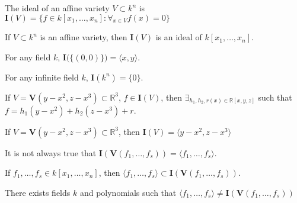 \documentclass[crop=false,class=book,oneside]{standalone}
\begin{document}
                \begin{definition}
                    The ideal of an affine variety
                    $V\subset k^n$ is
                    $\mathbf{I}(V)%
                     =\{f\in k[x_1,\hdots ,x_n]:\forall_{x\in V}f(x)=0\}$
                \end{definition}
                \begin{theorem}
                    If $V\subset k^n$ is an affine variety,
                    then $\mathbf{I}(V)$ is an ideal of
                    $k[x_1,\hdots ,x_n]$.
                \end{theorem}
                \begin{theorem}
                    For any field $k$,
                    $\mathbf{I}\big(\{(0,0)\}\big)=\langle x,y\rangle$.
                \end{theorem}
                \begin{theorem}
                    For any infinite field $k$,
                    $\mathbf{I}(k^n)=\{0\}$.
                \end{theorem}
                \begin{theorem}
                    If $V=\mathbf{V}(y-x^2,z-x^3)\subset\mathbb{R}^3$,
                    $f\in \mathbf{I}(V)$,
                    then $\exists_{h_1,h_2,r(x)\in\mathbb{R}[x,y,z]}$
                    such that $f=h_1(y-x^2)+h_2(z-x^3)+r$.
                \end{theorem}
                \begin{theorem}
                    If $V=\mathbf{V}(y-x^2,z-x^3)\subset\mathbb{R}^3$,
                    then $\mathbf{I}(V)=\langle y-x^2,z-x^3\rangle$
                \end{theorem}
                \begin{remark}
                    It is not always true that
                    $\mathbf{I}(\mathbf{V}(f_1,\hdots, f_s))%
                     =\langle f_1,\hdots, f_s\rangle$.
                \end{remark}
                \begin{theorem}
                    If $f_1,\hdots, f_s \in k[x_1,\hdots ,x_n]$, then
                    $\langle f_1,\hdots,f_s\rangle%
                     \subset\mathbf{I}(\mathbf{V}(f_1,\hdots, f_s))$.
                \end{theorem}
                \begin{theorem}
                    There exists fields $k$ and polynomials
                    such that
                    $\langle f_1,\hdots,f_s\rangle%
                     \ne\mathbf{I}(\mathbf{V}(f_1,\hdots, f_s))$
                \end{theorem}
\end{document}
